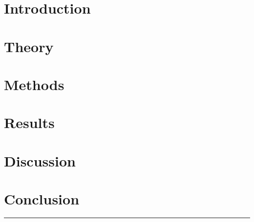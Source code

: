 \documentclass[5p,sort&compress]{elsarticle}
\begin{document}
{ %
\hypersetup{linkcolor=purple}

\tableofcontents




\section{Introduction}
\label{intro}


\section{Theory}
\label{theory}


\section{Methods}
\label{methods}


\section{Results}
\label{results}


\section{Discussion}
\label{discussion}


\section{Conclusion}
\label{conclusion}


}
\begingroup
\begin{center}
  \rule{2cm}{.4pt}
\end{center}
\makeatletter
{}
\makeatother



\endgroup
\end{document}
